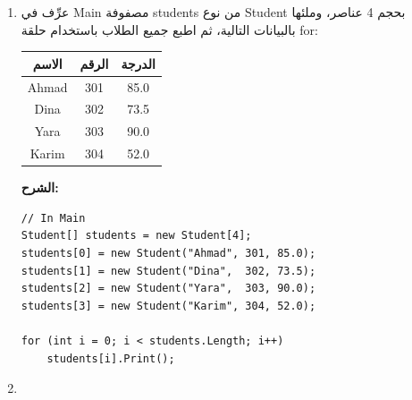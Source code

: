 \documentclass[14pt]{extarticle}
\begin{document}
\begin{enumerate}
\begin{english}
\begin{verbatim}
if (s1.IsPassing())
    Console.WriteLine(s1.GetName() + " is passing.");
else
    Console.WriteLine(s1.GetName() + " is failing.");

if (s2.IsPassing())
    Console.WriteLine(s2.GetName() + " is passing.");
else
    Console.WriteLine(s2.GetName() + " is failing.");
\end{verbatim}
\end{english}
\clearpage
\fi

\item %

عرِّف في \textenglish{Main} مصفوفة \textenglish{students} من نوع \textenglish{Student} بحجم 4 عناصر، وملئها بالبيانات التالية، ثم اطبع جميع الطلاب باستخدام حلقة \textenglish{for}:

\begin{center}
\begin{tabular}{|c|c|c|}
\hline
\textbf{الاسم} & \textbf{الرقم} & \textbf{الدرجة} \\
\hline
\textenglish{Ahmad} & \textenglish{301} & \textenglish{85.0} \\
\textenglish{Dina}  & \textenglish{302} & \textenglish{73.5} \\
\textenglish{Yara}  & \textenglish{303} & \textenglish{90.0} \\
\textenglish{Karim} & \textenglish{304} & \textenglish{52.0} \\
\hline
\end{tabular}
\end{center}

\ifwithsols
\textbf{الشرح:}
\begin{english}
\begin{verbatim}
// In Main
Student[] students = new Student[4];
students[0] = new Student("Ahmad", 301, 85.0);
students[1] = new Student("Dina",  302, 73.5);
students[2] = new Student("Yara",  303, 90.0);
students[3] = new Student("Karim", 304, 52.0);

for (int i = 0; i < students.Length; i++)
    students[i].Print();
\end{verbatim}
\end{english}
\clearpage
\fi

\item %


\end{enumerate}
\end{document}
